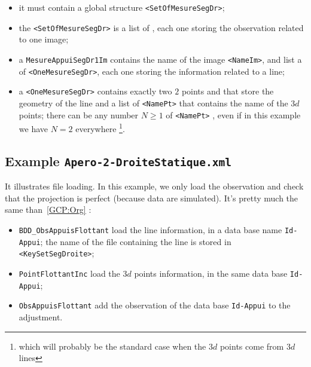 \begin{itemize}
   \item it must contain a global structure {\tt <SetOfMesureSegDr>};
   \item the {\tt <SetOfMesureSegDr>} is a list of {\tt <MesureAppuiSegDr1Im>}, each one
         storing the observation related to one image;
   \item a  {\tt MesureAppuiSegDr1Im} contains the name of the image {\tt <NameIm>}, and list a of {\tt <OneMesureSegDr>}, each one storing the information related to a line;

   \item a   {\tt <OneMesureSegDr>} contains exactly two $2$ points {\tt <Pt1Im>} and {\tt <Pt2Im>} that store 
            the geometry of the line and a list of {\tt <NamePt>} that contains the name of the $3d$ points; 
            there can be any number $N \geq 1$ of  {\tt <NamePt>} , even if in this example we 
             have $N=2$ everywhere 
             \footnote{which will probably be the standard case when the $3d$ points come from $3d$ lines}.

\end{itemize}


\subsection{Example {\tt Apero-2-DroiteStatique.xml}}

\label{Apero-2-DroiteStatique}

It illustrates file loading.
In this example, we only load the observation and check that the projection is perfect (because data
are simulated). It's pretty much the same than~\ref{GCP:Org} :

\begin{itemize}
   \item {\tt BDD\_ObsAppuisFlottant} load the line information, in a data base name {\tt Id-Appui};
         the name of the file containing the line is stored in {\tt  <KeySetSegDroite>};
   \item {\tt PointFlottantInc} load the $3d$ points information, in the same data base {\tt Id-Appui};
   \item {\tt ObsAppuisFlottant} add the observation of the data base {\tt Id-Appui} to the adjustment.
\end{itemize}

